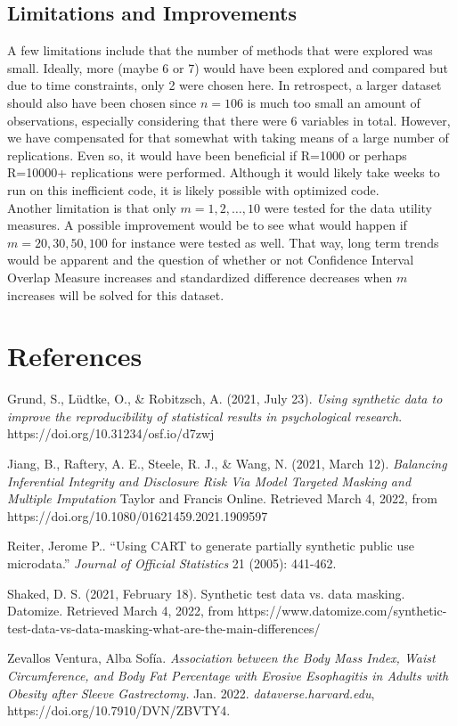 \documentclass[12pt]{article}
\begin{document}
\subsection*{Limitations and Improvements}
A few limitations include that the number of methods that were explored was small. Ideally, more (maybe 6 or 7) would have been explored and compared but due to time constraints, only 2 were chosen here. In retrospect, a larger dataset should also have been chosen since $n=106$ is much too small an amount of observations, especially considering that there were 6 variables in total. However, we have compensated for that somewhat with taking means of a large number of replications. Even so, it would have been beneficial if R=1000 or perhaps R=10000+ replications were performed. Although it would likely take weeks to run on this inefficient code, it is likely possible with optimized code.\\
Another limitation is that only $m=1,2,\dots,10$ were tested for the data utility measures. A possible improvement would be to see what would happen if $m=20,30,50,100$ for instance were tested as well. That way, long term trends would be apparent and the question of whether or not Confidence Interval Overlap Measure increases and standardized difference decreases when $m$ increases will be solved for this dataset.

\newpage
\section*{References}
\begin{enumerate}[label={[\arabic*]}]
	\item Grund, S., Lüdtke, O., \& Robitzsch, A. (2021, July 23). \textit{Using synthetic data to improve the reproducibility of statistical results in psychological research}. https://doi.org/10.31234/osf.io/d7zwj
	\item Jiang, B., Raftery, A. E., Steele, R. J., \& Wang, N. (2021, March 12). \textit{Balancing Inferential Integrity and Disclosure Risk Via Model Targeted Masking and Multiple Imputation} Taylor and Francis Online. Retrieved March 4, 2022, from https://doi.org/10.1080/01621459.2021.1909597 
	\item Reiter, Jerome P.. “Using CART to generate partially synthetic public use microdata.” \textit{Journal of Official Statistics} 21 (2005): 441-462.
	\item Shaked, D. S. (2021, February 18). Synthetic test data vs. data masking. Datomize. Retrieved March 4, 2022, from https://www.datomize.com/synthetic-test-data-vs-data-masking-what-are-the-main-differences/ 
	\item Zevallos Ventura, Alba Sofía. \textit{Association between the Body Mass Index, Waist Circumference, and Body Fat Percentage with Erosive Esophagitis in Adults with Obesity after Sleeve Gastrectomy.} Jan. 2022. \textit{dataverse.harvard.edu}, https://doi.org/10.7910/DVN/ZBVTY4.
\end{enumerate}
\end{document}
